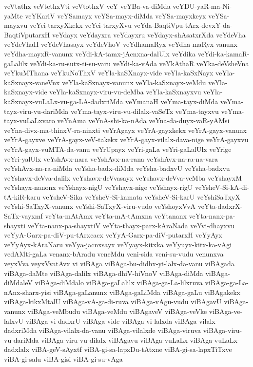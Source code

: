 {veVtathx
veVtethxVti
veVtothxV
veY
veYBa-va-diMda
veYDU-yaR-ma-Ni-yaMte
veYKariV
veYSamayx
veYSa-mayx-diMda
veYSa-mayxkeyx
veYSa-mayxvu
veYci-tarxyXkekx
veYci-tarxyXvu
veYda-BaqtiVpu-tArx-devxY-da-BaqtiVputarxH
veYdayx
veYdayxra
veYdayxru
veYdayx-shAsatxrXda
veYdeVha
veYdeVhaH
veYdeVhasayx
veYdeVhoV
veYdhamaRyx
veYdha-maRyx-vanunx
veYdha-mayxR-vanunx
veYdi-kA-tamx-jAcnxna-dalUlx
veYdika
veYdi-ka-kamaR-gaLalilx
veYdi-ka-ru-sutx-ti-su-varu
veYdi-ka-vAda
veYkAthaR
veYka-deVsheVna
veYkuMThana
veYkuNoThxV
veYla-kaSXnayx-vide
veYla-kaSxNayx
veYla-kaSxnayx-vaneVnx
veYla-kaSxnayx-vanunx
veYla-kaSxnayx-veMdu
veYla-kaSxnayx-vide
veYla-kaSxnayx-viru-vu-deMba
veYla-kaSxnayxvu
veYla-kaSxnayx-vuLaLx-vu-ga-LA-dadxriMda
veYmanaH
veYma-tayx-diMda
veYma-tayx-viru-vu-dariMda
veYma-tayx-viru-vu-dilalx-vaSeTx
veYma-tayxvu
veYma-tayx-vuLaLxvaro
veYnAma
veYnA-shi-ka-nAda
veYna-da-duyx-vaR-yAMsi
veYna-divx-ma-thinxV-ra-ninxti
veYrAgayx
veYrA-gayxkekx
veYrA-gayx-vanunx
veYrA-gayxve
veYrA-gayx-veV-takekx
veYrA-gayx-vilalx-dava-nige
veYrA-gayxvu
veYrA-gayx-vuMTA-da-vanu
veYrUpayx
veYri-gaLa
veYri-gaLalUlx
veYrige
veYri-yalUlx
veYshAvx-nara
veYshAvx-na-rana
veYshAvx-na-ra-na-vara
veYshAvx-na-ra-niMda
veYsha-badx-diMda
veYsha-badxvU
veYsha-badxvu
veYshavx-deVva-dalilx
veYshavx-deVvasayx
veYshavx-deVva-veMba
veYshayxM
veYshayx-nanonx
veYshayx-nigU
veYshayx-nige
veYshayx-rigU
veYsheV-Si-kA-di-tA-kiR-karu
veYsheV-Sika
veYsheV-Si-kamata
veYsheV-Si-karU
veYshiSaTxyX
veYshi-SaTxyX-vanunx
veYshi-SaTxyX-viru-vudo
veYshoyxVvA
veYta-dadxrX-SaTx-vayxmf
veYta-mAtAmx
veYta-mA-tAmxna
veYtananx
veYta-nanx-pa-shayxti
veYta-nanx-pa-shayxtiV
veYta-thayx-parx-kAraNada
veYvi-dhayxvu
veYyA-Garx-pa-diV-pu-tArxcacx
veYyA-Garx-pa-diV-putarxH
veYyAyx
veYyAyx-kAraNaru
veYya-jacnxsayx
veYyayx-kitxka
veYyuyx-kitx-ka-vAgi
vedAMti-gaLa
venanx-bAradu
veneMdu
veni-sida
veni-su-vudu
venunxva
veyxVva
veyxVvatAvx
vi
viBAga
viBAga-bu-didhx-yi-lalx-da-vanu
viBAgada
viBAga-daMte
viBAga-dalilx
viBAga-dhiV-hiVnoV
viBAga-diMda
viBAga-diMdaleV
viBAga-diMdalo
viBAga-gaLalilx
viBAga-ga-La-lilxruva
viBAga-ga-La-nAnx-sharx-yisi
viBAga-gaLanunx
viBAga-gaLiMda
viBAga-gaLu
viBAgakekx
viBAga-kikxMtalU
viBAga-vA-ga-di-ruva
viBAga-vAgu-vudu
viBAgavU
viBAga-vanunx
viBAga-veMbudu
viBAga-veMdu
viBAgaveV
viBAga-veVke
viBAga-ve-lalxvU
viBAga-vi-dadxrU
viBAga-vide
viBAga-vi-lalxda
viBAga-vilalx-dadxriMda
viBAga-vilalx-da-vanu
viBAga-vilalxde
viBAga-viruva
viBAga-viru-vu-dariMda
viBAga-viru-vu-dilalx
viBAgavu
viBAga-vuLaLx
viBAga-vuLaLx-dadxlalx
viBA-geV-sAyxtf
viBA-gi-sa-lapxDu-tAtxne
viBA-gi-sa-lapxTiTxve
viBA-gi-salu
viBA-gisi
viBA-gi-su-vAga
}
